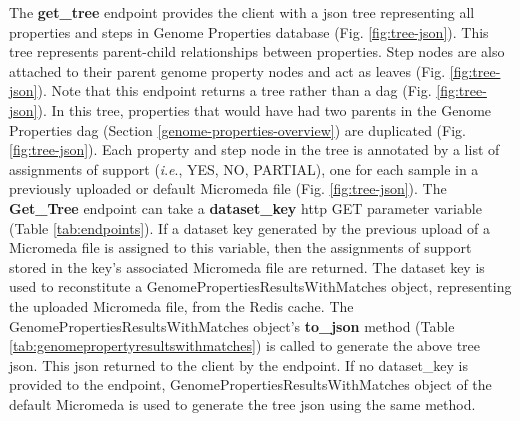 The \textbf{get\_tree} endpoint provides the client with a \gls{json} tree 
representing all properties and steps in Genome Properties database (Fig. 
\ref{fig:tree-json}). This tree represents parent-child relationships between 
properties. Step nodes are also attached to their parent genome property nodes 
and act as leaves (Fig. \ref{fig:tree-json}). Note that this endpoint returns a 
tree rather than a \gls{dag} (Fig. \ref{fig:tree-json}). In this tree, 
properties that would have had two parents in the Genome Properties \gls{dag} 
(Section \ref{genome-properties-overview}) are duplicated (Fig. 
\ref{fig:tree-json}). Each property and step node in the tree is annotated by a 
list of assignments of support (\textit{i}.\textit{e}., YES, NO, PARTIAL), one for each sample in 
a previously uploaded or default Micromeda file (Fig. \ref{fig:tree-json}). The 
\textbf{Get\_Tree} endpoint can take a \textbf{dataset\_key} \gls{http} GET 
parameter variable (Table \ref{tab:endpoints}). If a dataset key generated by 
the previous upload of a Micromeda file is assigned to this variable, then the 
assignments of support stored in the key's associated Micromeda file are 
returned. The dataset key is used to reconstitute a 
GenomePropertiesResultsWithMatches object, representing the uploaded Micromeda 
file, from the Redis cache. The GenomePropertiesResultsWithMatches object's 
\textbf{to\_json} method (Table \ref{tab:genomepropertyresultswithmatches}) is 
called to generate the above tree \gls{json}. This \gls{json} returned to the 
client by the endpoint. If no dataset\_key is provided to the endpoint, 
GenomePropertiesResultsWithMatches object of the default Micromeda is used to 
generate the tree \gls{json} using the same method.

